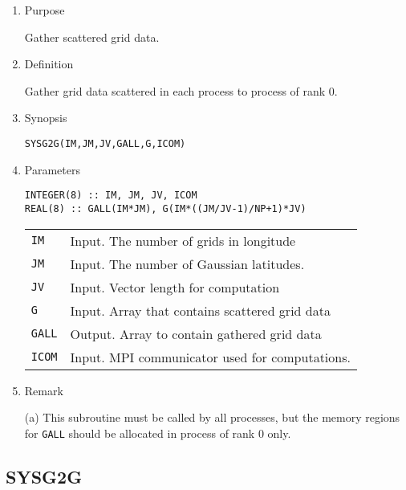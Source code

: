 \documentclass[a4paper]{scrartcl}
\begin{document}
\begin{enumerate}

\item Purpose 

Gather scattered grid data.  

\item Definition

Gather grid data scattered in each process to process of rank 0.  

\item Synopsis 

\texttt{SYSG2G(IM,JM,JV,GALL,G,ICOM)}
  
\item Parameters

\begin{verbatim}        
INTEGER(8) :: IM, JM, JV, ICOM
REAL(8) :: GALL(IM*JM), G(IM*((JM/JV-1)/NP+1)*JV)
\end{verbatim}      

\begin{tabular}{ll}
\texttt{IM} & Input. The number of grids in longitude\\
\texttt{JM} & Input. The number of Gaussian latitudes.\\
\texttt{JV} & Input. Vector length for computation\\
\texttt{G} & Input. Array that contains scattered grid data\\
\texttt{GALL} &  Output. Array to contain gathered grid data\\
\texttt{ICOM} & Input. MPI communicator used for computations.
\end{tabular}

\item Remark

(a) This subroutine must be called by all processes, but
the memory regions for \texttt{GALL} 
should be allocated in process of rank 0 only.

\end{enumerate}


\subsection{SYSG2G}
\end{document}
